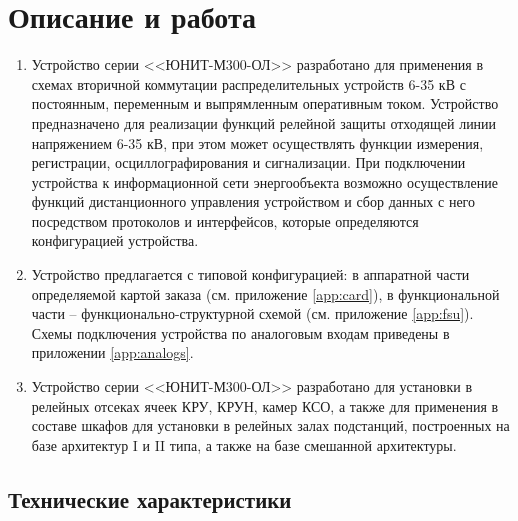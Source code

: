 \color{uniblue}\section[Описание и работа]{Описание и работа}
\color{black}

\color{black}

\begin{enumerate}

\item
Устройство серии <<ЮНИТ-М300-ОЛ>> разработано для применения в схемах вторичной коммутации распределительных устройств 6-35 кВ с постоянным, переменным и выпрямленным оперативным током. Устройство предназначено для реализации функций релейной защиты отходящей линии напряжением 6-35 кВ, при этом может осуществлять функции измерения, регистрации, осциллографирования и сигнализации. При подключении устройства к информационной сети энергообъекта возможно осуществление функций дистанционного управления устройством и сбор данных с него посредством протоколов и интерфейсов, которые определяются конфигурацией устройства.
\item 
Устройство предлагается с типовой конфигурацией: в аппаратной части определяемой картой заказа (см. приложение \ref{app:card}), в функциональной части -- функционально-структурной схемой (см. приложение \ref{app:fsu}). Схемы подключения устройства по аналоговым входам приведены в приложении \ref{app:analogs}.
\item
Устройство серии <<ЮНИТ-М300-ОЛ>> разработано для установки в релейных отсеках ячеек КРУ, КРУН, камер КСО, а также для применения в составе шкафов для установки в релейных залах подстанций, построенных на базе архитектур I и II типа, а также на базе смешанной архитектуры.

\end{enumerate}


\color{uniblue}\subsection{Технические характеристики}
\color{black}

